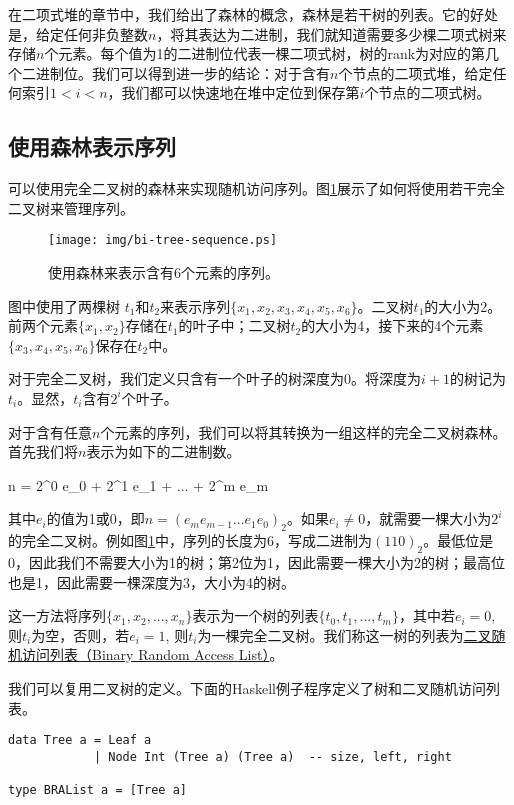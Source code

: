 \documentclass[UTF8]{article}
\begin{document}
在二项式堆的章节中，我们给出了森林的概念，森林是若干树的列表。它的好处是，给定任何非负整数$n$，将其表达为二进制，我们就知道需要多少棵二项式树来存储$n$个元素。每个值为1的二进制位代表一棵二项式树，树的rank为对应的第几个二进制位。我们可以得到进一步的结论：对于含有$n$个节点的二项式堆，给定任何索引$1 < i < n$，我们都可以快速地在堆中定位到保存第$i$个节点的二项式树。

\subsection{使用森林表示序列}

可以使用完全二叉树的森林来实现随机访问序列。图\ref{fig:bi-tree-sequence}展示了如何将使用若干完全二叉树来管理序列。

\begin{figure}[htbp]
  \centering
  \texttt{[image: img/bi-tree-sequence.ps]}
  \caption{使用森林来表示含有6个元素的序列。} \label{fig:bi-tree-sequence}
\end{figure}

图中使用了两棵树 $t_1$和$t_2$来表示序列$\{x_1, x_2, x_3, x_4, x_5, x_6\}$。二叉树$t_1$的大小为2。前两个元素$\{x_1, x_2\}$存储在$t_1$的叶子中；二叉树$t_2$的大小为4，接下来的4个元素$\{x_3, x_4, x_5, x_6\}$保存在$t_2$中。

对于完全二叉树，我们定义只含有一个叶子的树深度为0。将深度为$i+1$的树记为$t_i$。显然，$t_i$含有$2^i$个叶子。

对于含有任意$n$个元素的序列，我们可以将其转换为一组这样的完全二叉树森林。首先我们将$n$表示为如下的二进制数。

\be
n = 2^0 e_0 + 2^1 e_1 + ... + 2^m e_m
\ee

其中$e_i$的值为1或0，即$n=(e_m e_{m-1} ... e_1 e_0)_2$。如果$e_i \neq 0$，就需要一棵大小为$2^i$的完全二叉树。例如图\ref{fig:bi-tree-sequence}中，序列的长度为6，写成二进制为$(110)_2$。最低位是0，因此我们不需要大小为1的树；第2位为1，因此需要一棵大小为2的树；最高位也是1，因此需要一棵深度为3，大小为4的树。

这一方法将序列$\{x_1, x_2, ..., x_n\}$表示为一个树的列表$\{t_0, t_1, ..., t_m\}$，其中若$e_i = 0$, 则$t_i$为空，否则，若$e_i = 1$, 则$t_i$为一棵完全二叉树。我们称这一树的列表为\underline{二叉随机访问列表（Binary Random Access List）}\cite{okasaki-book}。

我们可以复用二叉树的定义。下面的Haskell例子程序定义了树和二叉随机访问列表。

\lstset{language=Haskell}
\begin{lstlisting}[style=Haskell]
data Tree a = Leaf a
            | Node Int (Tree a) (Tree a)  -- size, left, right

type BRAList a = [Tree a]
\end{lstlisting}
\end{document}
